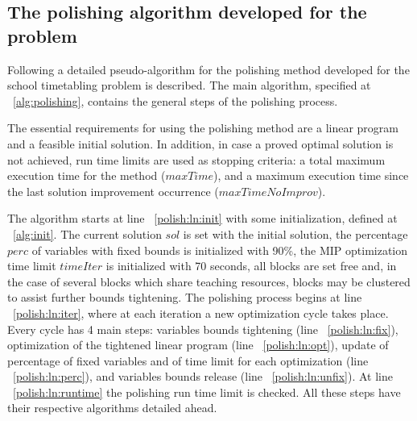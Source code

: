 \subsection{The polishing algorithm developed for the problem}

Following a detailed pseudo-algorithm for the polishing method developed for the school timetabling problem is described. The main algorithm, specified at ~\ref{alg:polishing}, contains the general steps of the polishing process.

The essential requirements for using the polishing method are a linear program and a feasible initial solution. In addition, in case a proved optimal solution is not achieved, run time limits are used as stopping criteria: a total maximum execution time for the method ($maxTime$), and a maximum execution time since the last solution improvement occurrence ($maxTimeNoImprov$).

The algorithm starts at line ~\ref{polish:ln:init} with some initialization, defined at ~\ref{alg:init}. The current solution $sol$ is set with the initial solution, the percentage $perc$ of variables with fixed bounds is initialized with 90\%, the MIP optimization time limit $timeIter$ is initialized with 70 seconds, all blocks are set free and, in the case of several blocks which share teaching resources, blocks may be clustered to assist further bounds tightening. The polishing process begins at line ~\ref{polish:ln:iter}, where at each iteration a new optimization cycle takes place. Every cycle has 4 main steps: variables bounds tightening (line ~\ref{polish:ln:fix}), optimization of the tightened linear program (line ~\ref{polish:ln:opt}), update of percentage of fixed variables and of time limit for each optimization (line ~\ref{polish:ln:perc}), and variables bounds release (line ~\ref{polish:ln:unfix}). At line ~\ref{polish:ln:runtime} the polishing run time limit is checked. All these steps have their respective algorithms detailed ahead.

